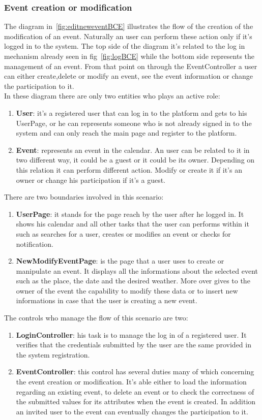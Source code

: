 \subsubsection{Event creation or modification}
The diagram in~\ref{fig:editneweventBCE} illustrates the flow of the creation of the modification of an event. Naturally an user can perform these action only if it's logged in to the system. The top side of the diagram it's related to the log in mechanism already seen in fig~\ref{fig:logBCE} while the bottom side represents the management of an event. From that point on through the EventController a user can either create,delete or modify an event, see the event information or change the participation to it.
\\In these diagram there are only two entities who plays an active role:
\begin{enumerate}
\item  {\bf User}: it's a registered user that can log in to the platform and gets to his UserPage, or he can  represents someone who is not already signed in  to the system and can only reach the main page and register to the platform.
\item  {\bf Event}: represents an event in the calendar. An user can be related to it in two different way, it could be a guest or it could be its owner. Depending on this relation it can perform different action. Modify or create it if it's an owner or change his participation if it's a guest.
\end{enumerate}
There are two boundaries involved in this scenario: \begin{enumerate}
\item  {\bf UserPage}: it stands for the page reach by the user after he logged in. It shows his calendar and all other tasks that the user can performs within it such as searches for a user, creates or modifies an event or checks for notification.
\item {\bf NewModifyEventPage}: is the page that a user uses to create or manipulate an event. It displays all the informations about the selected event such as the place, the date and the desired weather. More over gives to the owner of the event the capability to modify these data or to insert new informations in case that the user is creating a new event.
 \end{enumerate}
The controls who manage the flow of this scenario are two:\begin{enumerate}
\item {\bf LoginController}: his task is to manage the log in of a registered user. It verifies that the credentials submitted by the user are the same provided in the system registration.   
\item {\bf EventController}: this control has several duties many of which concerning the event creation or modification. It's able either to load the information regarding an existing event, to delete an event or to check the correctness of the submitted values for its attributes when the event is created. In addition an invited user to the event can eventually changes the participation to it.
\end{enumerate}

